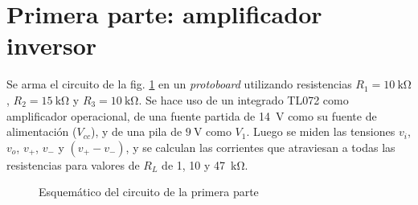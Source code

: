 \section{Primera parte: amplificador inversor}

Se arma el circuito de la fig. \ref{fig:1:esquema} en un \textit{protoboard}
utilizando resistencias $R_1 = \SI{10}{\kilo\ohm}$, $R_2 = \SI{15}{\kilo\ohm}$ y
$R_3 = \SI{10}{\kilo\ohm}$. Se hace uso de un integrado TL072 como amplificador
operacional, de una fuente partida de \SI{14}{\volt} como su fuente de 
alimentación ($V_{cc}$), y de una pila de $\SI{9}{\volt}$ como $V_1$.
Luego se miden las tensiones $v_i$, $v_o$, $v_{+}$,
$v_{-}$ y $\left(v_{+} - v_{-}\right)$, y se calculan las corrientes que
atraviesan a todas las resistencias para valores de $R_L$ de 1, 10 y
\SI{47}{\kilo\ohm}.

\begin{figure}[H]
    \centering
    
    \caption{Esquemático del circuito de la primera parte}
    \label{fig:1:esquema}
\end{figure}









% 
